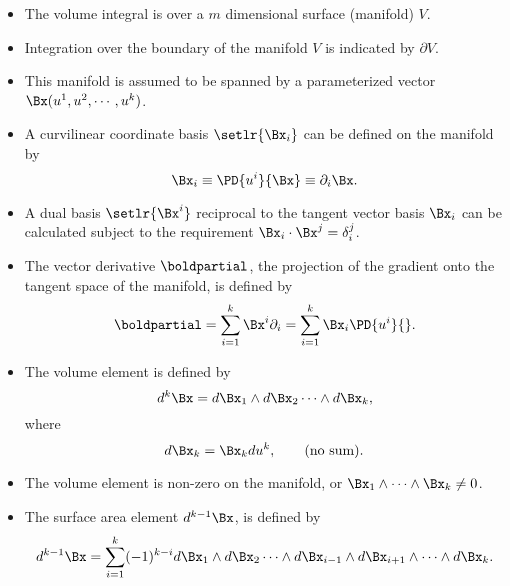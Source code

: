 \begin{itemize}
\item The volume integral is over a \(m\) dimensional surface (manifold) \( V \).
\item Integration over the boundary of the manifold \(V\) is indicated by \( \partial V \).
\item This manifold is assumed to be spanned by a parameterized vector \( \Bx(u^1, u^2, \cdots, u^k) \).
\item A curvilinear coordinate basis \( \setlr{ \Bx_i } \) can be defined on the manifold by
\begin{equation}\label{eqn:fundamentalTheoremOfCalculus:40}
\Bx_i \equiv \PD{u^i}{\Bx} \equiv \partial_i \Bx.
\end{equation}
\item A dual basis \( \setlr{\Bx^i} \) reciprocal to the tangent vector basis \( \Bx_i \) can be calculated subject to the requirement \( \Bx_i \cdot \Bx^j = \delta_i^j \).
\item The vector derivative \(\boldpartial\), the projection of the gradient onto the tangent space of the manifold, is defined by
\begin{equation}\label{eqn:fundamentalTheoremOfCalculus:100}
\boldpartial = \sum_{i = 1}^k \Bx^i \partial_i = \sum_{i=1}^k \Bx_i \PD{u^i}{}.
\end{equation}
\item The volume element is defined by
\begin{dmath}\label{eqn:fundamentalTheoremOfCalculus:60}
d^k \Bx = d\Bx_1 \wedge d\Bx_2 \cdots \wedge d\Bx_k,
\end{dmath}
where
\begin{dmath}\label{eqn:fundamentalTheoremOfCalculus:80}
d\Bx_k = \Bx_k du^k,\qquad \text{(no sum)}.
\end{dmath}
\item The volume element is non-zero on the manifold, or \( \Bx_1 \wedge \cdots \wedge \Bx_k \ne 0 \).
\item The surface area element \( d^{k-1} \Bx \), is defined by
\begin{dmath}\label{eqn:fundamentalTheoremOfCalculus:120}
d^{k-1} \Bx = \sum_{i = 1}^k (-1)^{k-i} d\Bx_1 \wedge d\Bx_2 \cdots \wedge d\Bx_{i-1} \wedge d\Bx_{i+1} \wedge \cdots \wedge d\Bx_k.
\end{dmath}


\end{itemize}
